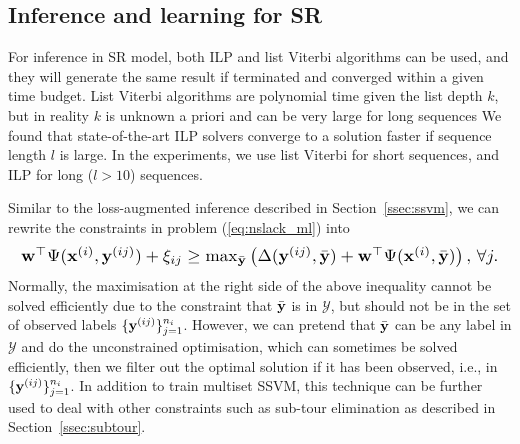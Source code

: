 

\subsection{Inference and learning for SR}
\label{ssec:SRinf}

For inference in SR model, both ILP and list Viterbi algorithms can be used, and they will generate the
same result if terminated and converged within a given time budget.
List Viterbi algorithms are polynomial time given the list depth $k$,
but in reality $k$ is unknown a priori and can be very large for long sequences
We found that state-of-the-art ILP solvers converge to a solution faster if sequence length $l$ is large.
In the experiments, we use list Viterbi for short sequences, and ILP for long ($l>10$) sequences.

Similar to the loss-augmented inference described in Section~\ref{ssec:ssvm},
we can rewrite the constraints in problem (\ref{eq:nslack_ml}) into
\begin{equation*}
\resizebox{0.99\linewidth}{!}
{$
\w^\top \Psi(\x^{(i)}, \y^{(ij)}) + \xi_{ij} \ge
\max_{\bar{\y}} \left( \Delta(\y^{(ij)}, \bar{\y}) + \w^\top \Psi(\x^{(i)}, \bar{\y}) \right),
\, \forall j.
$}
\end{equation*}
Normally, the maximisation at the right side of the above inequality cannot be solved efficiently due to the constraint that
$\bar{\mathbf{y}}$ is in $\mathcal{Y}$,
but should not be in the set of observed labels $\{\mathbf{y}^{(ij)}\}_{j=1}^{n_i}$.
However, we can pretend that $\bar{\mathbf{y}}$ can be any label in $\mathcal{Y}$ and do the unconstrained optimisation,
which can sometimes be solved efficiently, then we filter out the optimal solution if it has been observed,
i.e., in $\{\mathbf{y}^{(ij)}\}_{j=1}^{n_i}$.
In addition to train multiset SSVM, this technique can be further used to deal with other constraints such as sub-tour elimination
as described in Section~\ref{ssec:subtour}.

